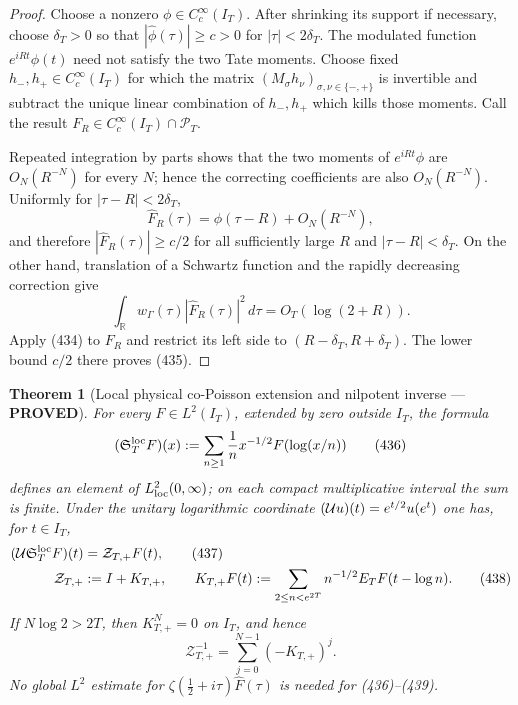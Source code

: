 \documentclass[11pt]{article}
\newtheorem{theorem}{Theorem}
\newcommand{\PROVED}{\textcolor{green!45!black}{\textbf{PROVED}}}
\begin{document}
\begin{proof}
Choose a nonzero $\phi\in C_c^\infty(I_T)$.  After shrinking its support if
necessary, choose $\delta_T>0$ so that
$|\widehat\phi(\tau)|\ge c>0$ for $|\tau|<2\delta_T$.
The modulated function $e^{iRt}\phi(t)$ need not satisfy the two Tate
moments.  Choose fixed $h_-,h_+\in C_c^\infty(I_T)$ for which the matrix
$(M_\sigma h_\nu)_{\sigma,\nu\in\{-,+\}}$ is invertible and subtract the
unique linear combination of $h_-,h_+$ which kills those moments.  Call the
result $F_R\in C_c^\infty(I_T)\cap\mathcal P_T$.

Repeated integration by parts shows that the two moments of
$e^{iRt}\phi$ are $O_N(R^{-N})$ for every $N$; hence the correcting
coefficients are also $O_N(R^{-N})$.  Uniformly for
$|\tau-R|<2\delta_T$,
\[
 \widehat F_R(\tau)=\widehat\phi(\tau-R)+O_N(R^{-N}),
\]
and therefore $|\widehat F_R(\tau)|\ge c/2$ for all sufficiently large
$R$ and $|\tau-R|<\delta_T$.  On the other hand, translation of a Schwartz
function and the rapidly decreasing correction give
\[
 \int_{\mathbb R}w_\Gamma(\tau)|\widehat F_R(\tau)|^2\,d\tau
 =O_T(\log(2+R)).
\]
Apply (434) to $F_R$ and restrict its left side to
$(R-\delta_T,R+\delta_T)$.  The lower bound $c/2$ there proves (435).
\end{proof}

\begin{theorem}[Local physical co-Poisson extension and nilpotent inverse ---
\PROVED]
For every $F\in L^2(I_T)$, extended by zero outside $I_T$, the formula
\begin{equation}
 (\mathfrak S_T^{\rm loc}F)(x)
 :=\sum_{n\ge1}\frac1n x^{-1/2}F(\log(x/n))          \tag{436}
\end{equation}
defines an element of $L^2_{\rm loc}(0,\infty)$; on each compact
multiplicative interval the sum is finite.  Under the unitary logarithmic
coordinate $({\cal U}u)(t)=e^{t/2}u(e^t)$ one has, for $t\in I_T$,
\begin{align}
 ({\cal U}\mathfrak S_T^{\rm loc}F)(t)
 &=\mathcal Z_{T,+}F(t),                             \tag{437}\\
 \mathcal Z_{T,+}
 &:=I+K_{T,+},\qquad
 K_{T,+}F(t):=
 \sum_{2\le n<e^{2T}}n^{-1/2}E_TF(t-\log n).        \tag{438}
\end{align}
If $N\log2>2T$, then $K_{T,+}^{N}=0$ on $I_T$, and hence
\begin{equation}
 \boxed{
 \mathcal Z_{T,+}^{-1}
 =\sum_{j=0}^{N-1}(-K_{T,+})^j.}                    \tag{439}
\end{equation}
No global $L^2$ estimate for $\zeta(\tfrac12+i\tau)\widehat F(\tau)$ is
needed for (436)--(439).
\end{theorem}
\end{document}
